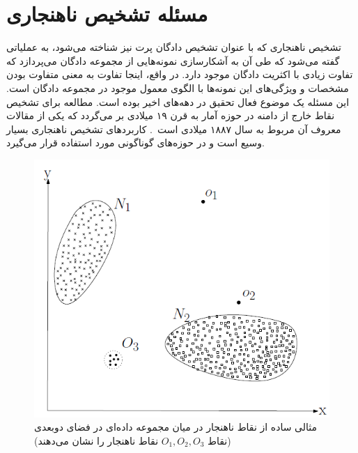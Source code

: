 \documentclass[12pt,a4paper]{report}
\theoremstyle{definition}
\theoremstyle{definition}
\begin{document}
	\section{مسئله تشخیص ناهنجاری}
تشخیص ناهنجاری که با عنوان تشخیص دادگان پرت نیز شناخته می‌شود، به عملیاتی گفته می‌شود که طی آن به آشکارسازی نمونه‌هایی از مجموعه دادگان می‌پردازد که تفاوت زیادی با اکثریت دادگان موجود دارد. در واقع، اینجا تفاوت به معنی متفاوت بودن مشخصات و ویژگی‌های این نمونه‌ها با الگوی معمول موجود در مجموعه دادگان است. این مسئله یک موضوع فعال تحقیق در دهه‌های اخیر بوده است. مطالعه برای تشخیص نقاط خارج از دامنه در حوزه آمار به قرن ۱۹ میلادی بر می‌گردد که یکی از مقالات معروف آن مربوط به سال ۱۸۸۷ میلادی است~\cite{Grubbs1969ProceduresFD}. کاربردهای تشخیص ناهنجاری بسیار وسیع است و در حوزه‌های گوناگونی مورد استفاده قرار می‌گیرد.\\

\begin{figure}[!hp]
	\begin{center}
		\includegraphics[width=0.5\linewidth]{./images/figures/anomaly-2d.png}

		\caption{
		مثالی ساده از نقاط ناهنجار در میان مجموعه داده‌ای در فضای دوبعدی (نقاط 
$O_1, O_2, O_3$
نقاط ناهنجار را نشان می‌دهند)
		\cite{V.Chandola}
		}		
		\label{fig:anomaly-example-1}
		\centering
	\end{center}
\end{figure}
\end{document}
